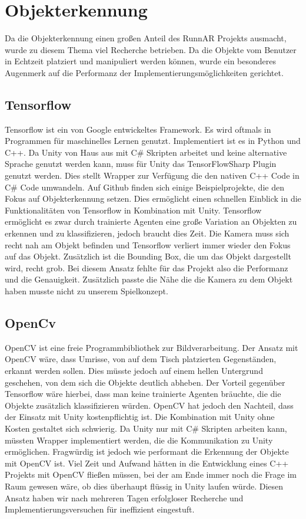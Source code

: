 \section{Objekterkennung}
Da die Objekterkennung einen großen Anteil des RunnAR Projekts ausmacht, wurde zu diesem Thema viel Recherche betrieben. Da die Objekte vom Benutzer in Echtzeit platziert und manipuliert werden können, wurde ein besonderes Augenmerk auf die Performanz der Implementierungsmöglichkeiten gerichtet.
\subsection{Tensorflow}
Tensorflow ist ein von Google entwickeltes Framework. Es wird oftmals in Programmen für maschinelles Lernen genutzt.  Implementiert ist es in Python und C++. Da Unity von Haus aus mit C\# Skripten arbeitet und keine alternative Sprache genutzt werden kann, muss für Unity das TensorFlowSharp Plugin genutzt werden. Dies stellt Wrapper zur Verfügung die den nativen C++ Code in C\#  Code umwandeln. Auf Github finden sich einige Beispielprojekte, die den Fokus auf Objekterkennung setzen. Dies ermöglicht einen schnellen Einblick in die Funktionalitäten von Tensorflow in Kombination mit Unity. Tensorflow ermöglicht es zwar durch trainierte Agenten eine große Variation an Objekten zu erkennen und zu klassifizieren, jedoch braucht dies Zeit. Die Kamera muss sich recht nah am Objekt befinden und Tensorflow verliert immer wieder den Fokus auf das Objekt. Zusätzlich ist die Bounding Box, die um das Objekt dargestellt wird, recht grob. Bei diesem Ansatz fehlte für das Projekt also die Performanz und die Genauigkeit. Zusätzlich passte die Nähe die die Kamera zu dem Objekt haben musste nicht zu unserem Spielkonzept.\cite{TensorFlow}

\subsection{OpenCv}
OpenCV ist eine freie Programmbibliothek zur Bildverarbeitung. Der Ansatz mit OpenCV wäre, dass Umrisse, von auf dem Tisch platzierten Gegenständen, erkannt werden sollen. Dies müsste jedoch auf einem hellen Untergrund geschehen, von dem sich die Objekte deutlich abheben. Der Vorteil gegenüber Tensorflow wäre hierbei, dass man keine trainierte Agenten bräuchte, die die Objekte zusätzlich klassifizieren würden. OpenCV hat jedoch den Nachteil, dass der Einsatz mit Unity kostenpflichtig ist. Die Kombination mit Unity ohne Kosten gestaltet sich schwierig. Da Unity nur mit C\#  Skripten arbeiten kann, müssten Wrapper implementiert werden, die die Kommunikation zu Unity ermöglichen. Fragwürdig ist jedoch wie performant die Erkennung der Objekte mit OpenCV ist. Viel Zeit und Aufwand hätten in die Entwicklung eines C++ Projekts mit OpenCV fließen müssen, bei der am Ende immer noch die Frage im Raum gewesen wäre, ob dies überhaupt flüssig in Unity laufen würde. Diesen Ansatz haben wir nach mehreren Tagen erfolgloser  Recherche und Implementierungsversuchen für ineffizient eingestuft. 

